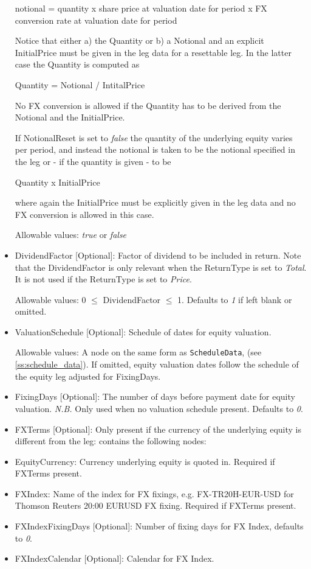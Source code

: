 \begin{itemize}
  notional = quantity x share price at valuation date for period x FX conversion rate at valuation date for period

  Notice that either a) the Quantity or b) a Notional and an explicit InitialPrice must be given in the leg data for a
  resettable leg. In the latter case the Quantity is computed as

  Quantity = Notional / IntitalPrice

  No FX conversion is allowed if the Quantity has to be derived from the Notional and the InitialPrice.

  If NotionalReset is set to \emph{false} the quantity of the underlying equity varies per period, and instead the
  notional is taken to be the notional specified in the leg or - if the quantity is given - to be

  Quantity x InitialPrice

  where again the InitialPrice must be explicitly given in the leg data and no FX conversion is allowed in this case.

  Allowable values:  \emph{true} or  \emph{false}

\item DividendFactor [Optional]: Factor of dividend to be included in return. Note that the DividendFactor is only relevant when the ReturnType is set to  \emph{Total}. It is not used if the ReturnType is set to \emph{Price}.

Allowable values: 0 $\leq$ DividendFactor $\leq$  1.   Defaults to \emph{1} if left blank or omitted.

\item ValuationSchedule [Optional]: Schedule of dates for equity valuation.

Allowable values: A node on the same form as \lstinline!ScheduleData!, (see \ref{ss:schedule_data}). If omitted, equity valuation dates follow the schedule of the equity leg adjusted for FixingDays.

\item FixingDays [Optional]: The number of days before payment date for equity valuation. \emph{N.B.} Only used when no valuation schedule present. Defaults to \emph{0}.

\item FXTerms [Optional]: Only present if the currency of the underlying equity is different from the leg: contains the following nodes:

\item EquityCurrency: Currency underlying equity is quoted in. Required if FXTerms present.

\item FXIndex: Name of the index for FX fixings, e.g. FX-TR20H-EUR-USD for Thomson Reuters 20:00 EURUSD FX fixing. Required if FXTerms present.

\item FXIndexFixingDays [Optional]: Number of fixing days for FX Index, defaults to \emph{0}.

\item FXIndexCalendar [Optional]: Calendar for FX Index.

\end{itemize}

